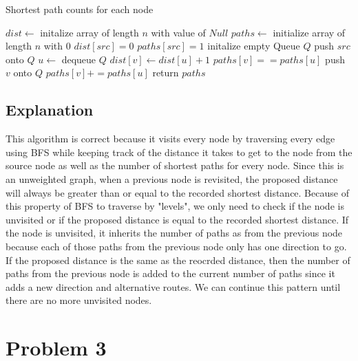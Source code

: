 \documentclass[12pt]{article}
\begin{document}
\begin{algorithm}
\caption{Shortest path counts for each node}
\begin{algorithmic}[1]
    \State $dist \gets $ initalize array of length $n$ with value of $Null$
    \State $paths \gets $ initialize array of length $n$ with $0$
    \State $dist[src] = 0$
    \State $paths[src] = 1$
    \State initalize empty Queue $Q$
    \State push $src$ onto $Q$
        \State $u \gets $ dequeue $Q$
                \State $dist[v] \gets dist[u]+1$
                \State $paths[v]==paths[u]$
                \State push $v$ onto $Q$
            \Else
                    \State $paths[v] += paths[u]$
                \EndIf
            \EndIf
        \EndFor 
    \EndWhile
    \State return $paths$
\end{algorithmic}
\end{algorithm}
\subsection*{Explanation}
This algorithm is correct because it visits every node by traversing every edge using BFS while 
keeping track of the distance it takes to get to the node from the source node as well as the number
of shortest paths for every node. Since this is an unweighted graph, when a previous node is revisited,
the proposed distance will always be greater than or equal to the recorded shortest distance. Because of this property
of BFS to traverse by "levels", we only need to check if the node is unvisited or if the proposed distance
is equal to the recorded shortest distance. If the node is unvisited, it inherits the number of paths as from
the previous node because each of those paths from the previous node only has one direction to go. If the
proposed distance is the same as the reocrded distance, then the number of paths from the previous node is 
added to the current number of paths since it adds a new direction and alternative routes. We can continue
this pattern until there are no more unvisited nodes.

\newpage
\section*{Problem 3}
\end{document}
